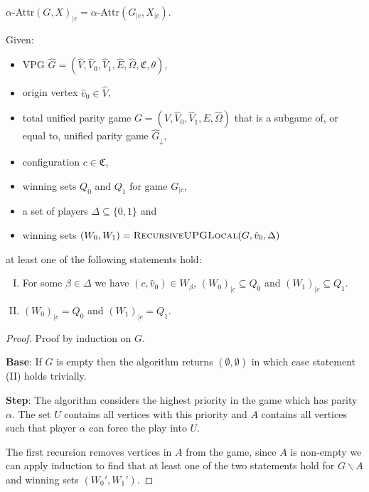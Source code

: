 \begin{lemma}
	\label{lem_projected_attr_is_attr_of_projected}
	$\alpha$-Attr$(G,X)_{|c}= \alpha$-Attr$(G_{|c},X_{|c})$.
\end{lemma}
\begin{theorem}
	Given:
	\begin{itemize}
		\item VPG $\hat{G} = (\hat{V}, \hat{V}_0,\hat{V}_1,\hat{E},\hat{\Omega},\mathfrak{C},\theta)$,
		\item origin vertex $\hat{v}_0 \in \hat{V}$,
		\item total unified parity game $G = (V, \hat{V}_0, \hat{V}_1,E,\hat{\Omega})$ that is a subgame of, or equal to, unified parity game $\hat{G}_{\downarrow}$,
		\item configuration $c\in \mathfrak{C}$,
		\item winning sets $Q_0$ and $Q_1$ for game $G_{|c}$,
		\item a set of players $\Delta \subseteq \{0,1\}$ and
		\item winning sets $(W_0, W_1) = \textsc{RecursiveUPGLocal}(G,\hat{v}_0,\Delta)$
	\end{itemize}
	at least one of the following statements hold:
	\begin{enumerate}[(I)]
		\item For some $\beta \in \Delta$ we have $(c,\hat{v}_0) \in W_\beta$, $(W_0)_{|c} \subseteq Q_0$ and $(W_1)_{|c} \subseteq Q_1$.
		\item $(W_0)_{|c} = Q_0$ and $(W_1)_{|c} = Q_1$.
	\end{enumerate}
	\begin{proof}
		Proof by induction on $G$.
		
		\textbf{Base}: If $G$ is empty then the algorithm returns $(\emptyset,\emptyset)$ in which case statement (II) holds trivially.
		
		\textbf{Step}:
		The algorithm considers the highest priority in the game which has parity $\alpha$. The set $U$ contains all vertices with this priority and $A$ contains all vertices such that player $\alpha$ can force the play into $U$.
		
		The first recursion removes vertices in $A$ from the game, since $A$ is non-empty we can apply induction to find that at least one of the two statements hold for $G\backslash A$ and winning sets $(W_0',W_1')$.
		

\end{proof}
\end{theorem}
